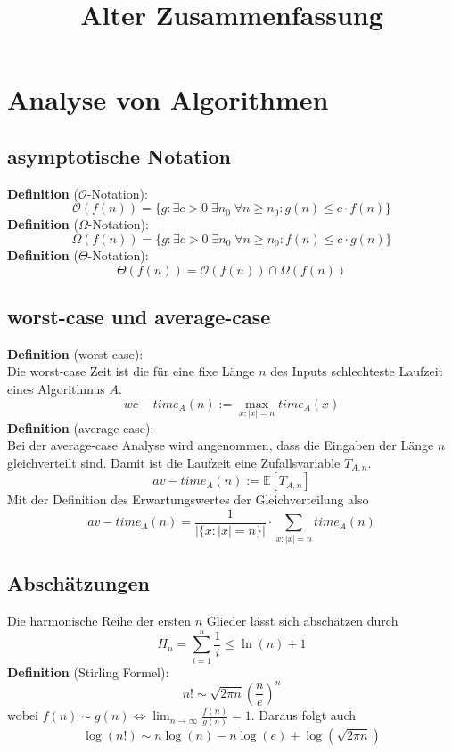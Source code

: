 \documentclass[a4paper, 12pt]{article}
\begin{document}
	\begin{titlepage} 
		\title{Alter Zusammenfassung}
		\clearpage\maketitle
		\thispagestyle{empty}
	\end{titlepage}
	\tableofcontents
	\section{Analyse von Algorithmen}
	\subsection{asymptotische Notation}
	\textbf{Definition} ($\mathcal{O}$-Notation):
	\[\mathcal{O}(f(n)) = \{g: \exists c>0\; \exists n_0 \; \forall n\geq n_0: g(n) \leq c\cdot f(n)\}\]
	\textbf{Definition} ($\Omega$-Notation):
	\[\Omega(f(n)) = \{g: \exists c>0\; \exists n_0 \; \forall n\geq n_0: f(n) \leq c\cdot g(n)\}\]
	\textbf{Definition} ($\Theta$-Notation): \[\Theta(f(n)) = \mathcal{O}(f(n)) \cap \Omega(f(n))\]

	\subsection{worst-case und average-case}
	\textbf{Definition} (worst-case):\\
	Die worst-case Zeit ist die für eine fixe Länge $n$ des Inputs schlechteste Laufzeit eines Algorithmus $A$. \[wc-time_A(n) := \max_{x: \left|x\right| = n} time_A(x)\]
	\textbf{Definition} (average-case):\\
	Bei der average-case Analyse wird angenommen, dass die Eingaben der Länge $n$ gleichverteilt sind. Damit ist die Laufzeit eine Zufallsvariable $T_{A,n}$. \[av-time_{A}(n) := \mathbb{E}[T_{A,n}]\] Mit der Definition des Erwartungswertes der Gleichverteilung also \[av-time_A(n) = \frac{1}{\left|\{x: \left|x\right| = n\}\right|} \cdot \sum_{x: \left|x\right| = n} time_A(n)\]
	\subsection{Abschätzungen}
	Die harmonische Reihe der ersten $n$ Glieder lässt sich abschätzen durch \[H_n = \sum_{i=1}^{n} \frac{1}{i} \leq \ln(n)+1\]
	\textbf{Definition} (Stirling Formel):
	\[n! \sim \sqrt{2\pi n} (\frac{n}{e})^n\]
	wobei $f(n) \sim g(n) \Leftrightarrow \lim_{n\to\infty} \frac{f(n)}{g(n)} = 1$. Daraus folgt auch \[\log(n!) \sim n\log(n) - n\log(e) + \log(\sqrt{2\pi n})\]
\end{document}
